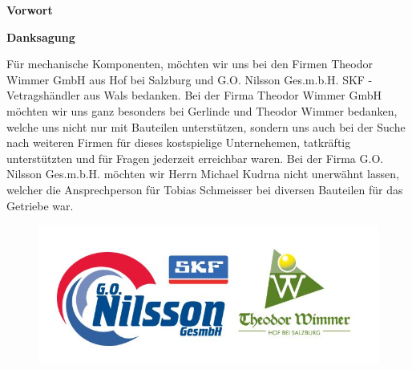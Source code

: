 \begin{center}
\begin{huge}
\textbf{Vorwort}
\end{huge}
\end{center}

\bigskip
{}


\newpage
\thispagestyle{empty}
\mbox{}
\newpage

\begin{center}
\begin{huge}
\textbf{Danksagung}
\end{huge}
\end{center}

Für mechanische Komponenten, möchten wir uns bei den Firmen Theodor Wimmer GmbH aus Hof bei Salzburg und G.O. Nilsson Ges.m.b.H. SKF - Vetragshändler aus Wals bedanken. Bei der Firma Theodor Wimmer GmbH möchten wir uns ganz besonders bei Gerlinde und Theodor Wimmer bedanken, welche uns nicht nur mit Bauteilen unterstützen, sondern uns auch bei der Suche nach weiteren Firmen für dieses kostspielige Unternehemen, tatkräftig unterstützten und für Fragen jederzeit erreichbar waren. Bei der Firma G.O. Nilsson Ges.m.b.H. möchten wir Herrn Michael Kudrna nicht unerwähnt lassen, welcher die Ansprechperson für Tobias Schmeisser bei diversen Bauteilen für das Getriebe war.

\begin{figure} [H]
	\begin{center}
		\includegraphics[scale=0.5]{figures/mechanik/Sponsoren.jpg}		
	\end{center}
\end{figure}
	

